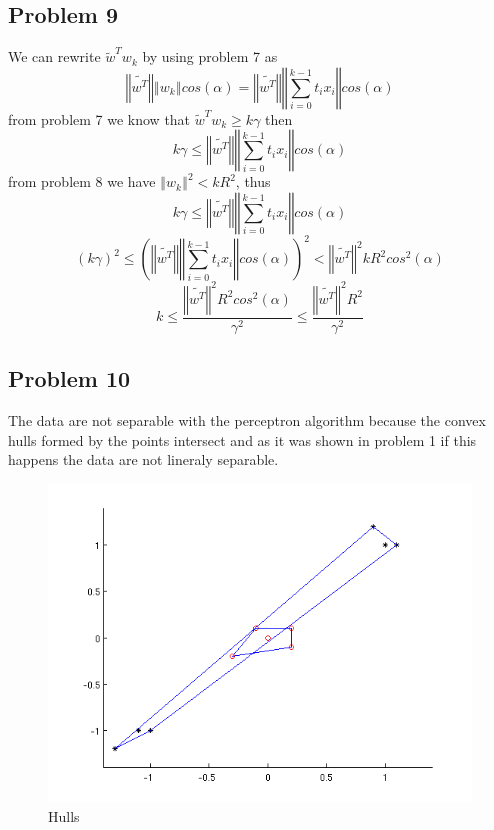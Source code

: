 \subsection*{Problem 9}
We can rewrite $\tilde{w}^{T}w_{k}$ by using problem 7 as 
\[
\left\Vert \tilde{w^{T}}\right\Vert \left\Vert w_{k}\right\Vert
cos(\alpha)=\left\Vert \tilde{w^{T}}\right\Vert \left\Vert
\sum_{i=0}^{k-1}t_{i}x_{i}\right\Vert cos(\alpha)
\]
from problem 7 we know that $\tilde{w}^{T}w_{k}\geq k\gamma$ then
\[
k\gamma\leq\left\Vert \tilde{w^{T}}\right\Vert \left\Vert
\sum_{i=0}^{k-1}t_{i}x_{i}\right\Vert cos(\alpha)
\]
from problem 8 we have $\left\Vert w_{k}\right\Vert ^{2}<kR^{2}$,
thus 
\[
k\gamma\leq\left\Vert \tilde{w^{T}}\right\Vert \left\Vert
\sum_{i=0}^{k-1}t_{i}x_{i}\right\Vert cos(\alpha)
\]
\[
\left(k\gamma\right)^{2}\leq\left(\left\Vert \tilde{w^{T}}\right\Vert
\left\Vert \sum_{i=0}^{k-1}t_{i}x_{i}\right\Vert
cos(\alpha)\right)^{2}<\left\Vert \tilde{w^{T}}\right\Vert
^{2}kR^{2}cos^{2}(\alpha)
\]
\[
k\leq\frac{\left\Vert \tilde{w^{T}}\right\Vert
^{2}R^{2}cos^{2}(\alpha)}{\gamma^{2}}\leq\frac{\left\Vert
\tilde{w^{T}}\right\Vert ^{2}R^{2}}{\gamma^{2}}
\]
  
\newpage
\subsection*{Problem 10}
The data are not separable with the perceptron algorithm because the convex
hulls formed by the points intersect and as it was shown in problem 1 if this 
happens the data are not lineraly separable.
\begin{figure}
\centering{}\includegraphics[width=1\textwidth]{plots/10_hull_1}\caption{Hulls}
\end{figure}

